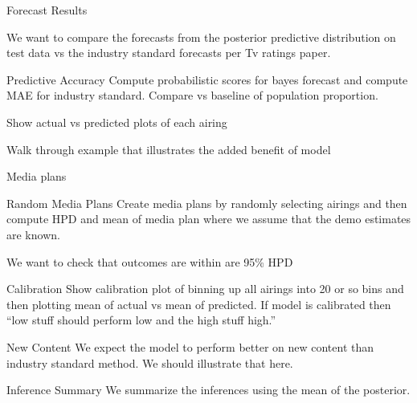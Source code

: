 \begin{chapter}{Forecast Results}

  We want to compare the forecasts from the posterior predictive distribution
  on test data vs the industry standard forecasts per Tv ratings paper.

  \begin{section}{Predictive Accuracy}
    Compute probabilistic scores for bayes forecast and compute MAE for industry
    standard. Compare vs baseline of population proportion.

    Show actual vs predicted plots of each airing

    Walk through example that illustrates the added benefit of model
  \end{section}

  \begin{section}{Media plans}

    \begin{subsection}{Random Media Plans}
      Create media plans by randomly selecting airings and then compute HPD and mean
      of media plan where we assume that the demo estimates are known.

      We want to check that outcomes are within are 95\% HPD
    \end{subsection}

    \begin{subsection}{Calibration}
      Show calibration plot of binning up all airings into 20 or so bins
      and then plotting mean of actual vs mean of predicted. If model is calibrated
      then ``low stuff should perform low and the high stuff high.''
    \end{subsection}
  \end{section}

  \begin{section}{New Content}
    We expect the model to perform better on new content than industry standard
    method. We should illustrate that here.
  \end{section}

  \begin{section}{Inference Summary}
    We summarize the inferences using the mean of the posterior.
  \end{section}

\end{chapter}